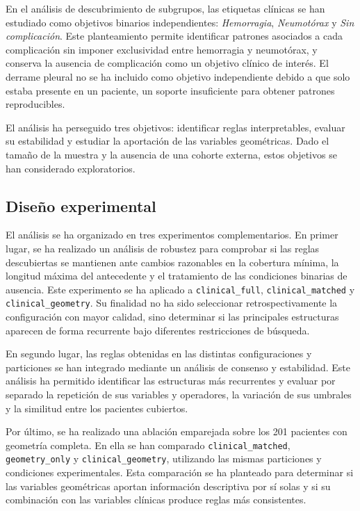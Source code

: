 En el análisis de descubrimiento de subgrupos, las etiquetas clínicas se han estudiado como objetivos binarios independientes: \textit{Hemorragia}, \textit{Neumotórax} y \textit{Sin complicación}. Este planteamiento permite identificar patrones asociados a cada complicación sin imponer exclusividad entre hemorragia y neumotórax, y conserva la ausencia de complicación como un objetivo clínico de interés. El derrame pleural no se ha incluido como objetivo independiente debido a que solo estaba presente en un paciente, un soporte insuficiente para obtener patrones reproducibles.

El análisis ha perseguido tres objetivos: identificar reglas interpretables, evaluar su estabilidad y estudiar la aportación de las variables geométricas. Dado el tamaño de la muestra y la ausencia de una cohorte externa, estos objetivos se han considerado exploratorios.


\subsection{Diseño experimental}

El análisis se ha organizado en tres experimentos complementarios. En primer lugar, se ha realizado un análisis de robustez para comprobar si las reglas descubiertas se mantienen ante cambios razonables en la cobertura mínima, la longitud máxima del antecedente y el tratamiento de las condiciones binarias de ausencia. Este experimento se ha aplicado a \texttt{clinical\_full}, \texttt{clinical\_matched} y \texttt{clinical\_geometry}. Su finalidad no ha sido seleccionar retrospectivamente la configuración con mayor calidad, sino determinar si las principales estructuras aparecen de forma recurrente bajo diferentes restricciones de búsqueda.

En segundo lugar, las reglas obtenidas en las distintas configuraciones y particiones se han integrado mediante un análisis de consenso y estabilidad. Este análisis ha permitido identificar las estructuras más recurrentes y evaluar por separado la repetición de sus variables y operadores, la variación de sus umbrales y la similitud entre los pacientes cubiertos.

Por último, se ha realizado una ablación emparejada sobre los 201 pacientes con geometría completa. En ella se han comparado \texttt{clinical\_matched}, \texttt{geometry\_only} y \texttt{clinical\_geometry}, utilizando las mismas particiones y condiciones experimentales. Esta comparación se ha planteado para determinar si las variables geométricas aportan información descriptiva por sí solas y si su combinación con las variables clínicas produce reglas más consistentes.

